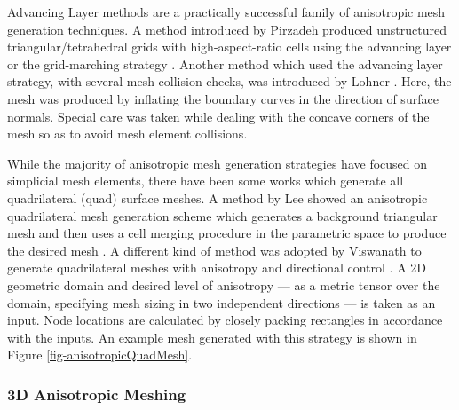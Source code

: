 Advancing Layer methods are a practically successful family of anisotropic mesh generation techniques. A method introduced by Pirzadeh produced unstructured triangular/tetrahedral grids with high-aspect-ratio cells using the advancing layer or the grid-marching strategy \cite{pirzadeh1994unstructured}. Another method which used the advancing layer strategy, with several mesh collision checks, was introduced by Lohner \cite{lohner1993matching}. Here, the mesh was produced by inflating the boundary curves in the direction of surface normals. Special care was taken while dealing with the concave corners of the mesh so as to avoid mesh element collisions.



While the majority of anisotropic mesh generation strategies have focused on simplicial mesh elements, there have been some works which generate all quadrilateral (quad) surface meshes. A method by Lee \etal showed an anisotropic quadrilateral mesh generation scheme which generates a background triangular mesh and then uses a cell merging procedure in the parametric space to produce the desired mesh \cite{lee2003new}. A different kind of method was adopted by Viswanath \etal to generate quadrilateral meshes with anisotropy and directional control \cite{viswanath2000quadrilateral}. A 2D geometric domain and desired level of anisotropy --- as a metric tensor over the domain, specifying mesh sizing in two independent directions --- is taken as an input. Node locations are calculated by closely packing rectangles in accordance with the inputs. An example mesh generated with this strategy is shown in Figure \ref{fig-anisotropicQuadMesh}.

\subsubsection{3D Anisotropic Meshing}
\label{sec-3D}

